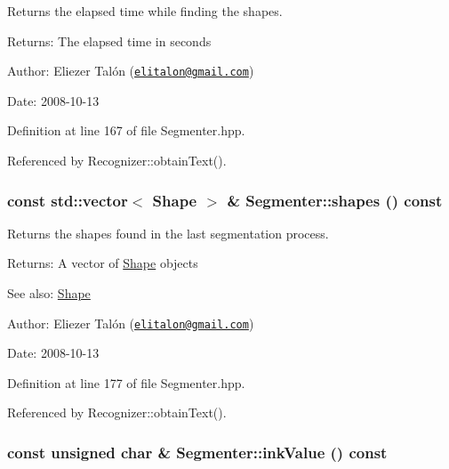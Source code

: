 Returns the elapsed time while finding the shapes. 

\begin{Desc}
\item[Returns:]The elapsed time in seconds\end{Desc}
\begin{Desc}
\item[Author:]Eliezer Talón (\href{mailto:elitalon@gmail.com}{\tt elitalon@gmail.com}) \end{Desc}
\begin{Desc}
\item[Date:]2008-10-13 \end{Desc}


Definition at line 167 of file Segmenter.hpp.

Referenced by Recognizer::obtainText().\hypertarget{class_segmenter_f2dd7f34c8b0f902323005335e41bd57}{
\subsubsection[shapes]{\setlength{\rightskip}{0pt plus 5cm}const std::vector$<$ {\bf Shape} $>$ \& Segmenter::shapes () const}}
\label{class_segmenter_f2dd7f34c8b0f902323005335e41bd57}


Returns the shapes found in the last segmentation process. 

\begin{Desc}
\item[Returns:]A vector of \hyperlink{class_shape}{Shape} objects\end{Desc}
\begin{Desc}
\item[See also:]\hyperlink{class_shape}{Shape}\end{Desc}
\begin{Desc}
\item[Author:]Eliezer Talón (\href{mailto:elitalon@gmail.com}{\tt elitalon@gmail.com}) \end{Desc}
\begin{Desc}
\item[Date:]2008-10-13 \end{Desc}


Definition at line 177 of file Segmenter.hpp.

Referenced by Recognizer::obtainText().\hypertarget{class_segmenter_e9bc56ddcbe5ea4abb40fcc85e3d9fbe}{
\subsubsection[inkValue]{\setlength{\rightskip}{0pt plus 5cm}const unsigned char \& Segmenter::inkValue () const}}
\label{class_segmenter_e9bc56ddcbe5ea4abb40fcc85e3d9fbe}


